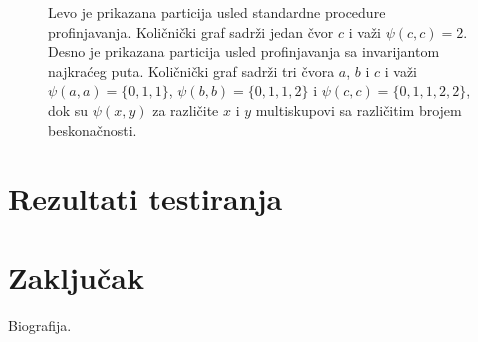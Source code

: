 \documentclass[12pt,oneside]{memoir}
\theoremstyle{definition}
\begin{document}
\begin{figure}[htp]
	   \caption{Levo je prikazana particija usled standardne procedure
	   profinjavanja. Količnički graf sadrži jedan čvor $c$ i važi $\psi(c, c)
	   = 2$. Desno je prikazana particija usled profinjavanja sa invarijantom
	   najkraćeg puta. Količnički graf sadrži tri čvora {\color{red}$a$},
	   {\color{green}$b$} i {\color{blue}$c$} i važi $\psi( a, a) = \{0, 1,
	   1\}$, $\psi(b, b) = \{0, 1, 1, 2\}$ i $\psi(c, c) = \{0, 1, 1, 2, 2\}$,
	   dok su $\psi(x, y)$ za različite $x$ i $y$ multiskupovi sa različitim
	   brojem beskonačnosti.}
	   \label{img:graphinv}
   \end{figure}

\chapter{Rezultati testiranja}

\chapter{Zaključak}

\literatura

\backmatter

\begin{biografija}
	Biografija.
\end{biografija}
\end{document}
